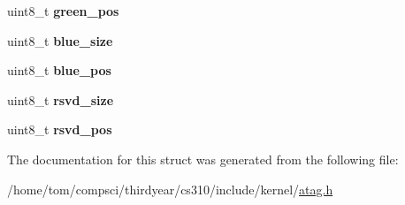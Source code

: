 \begin{DoxyCompactItemize}
\item 
\mbox{\label{structatag__videolfb_a6709301934177e265dcc87f13f64bd4a}} 
uint8\+\_\+t {\bfseries green\+\_\+pos}
\item 
\mbox{\label{structatag__videolfb_a240d9c637a8dac4b6bccba93d2561230}} 
uint8\+\_\+t {\bfseries blue\+\_\+size}
\item 
\mbox{\label{structatag__videolfb_ad1dabc14bd15a832bef855c4fc6e6089}} 
uint8\+\_\+t {\bfseries blue\+\_\+pos}
\item 
\mbox{\label{structatag__videolfb_a107ebdb85314153a554fca1d842688de}} 
uint8\+\_\+t {\bfseries rsvd\+\_\+size}
\item 
\mbox{\label{structatag__videolfb_ab1de4ada3fc00dd623b5b891f8d3cf9c}} 
uint8\+\_\+t {\bfseries rsvd\+\_\+pos}
\end{DoxyCompactItemize}


The documentation for this struct was generated from the following file\+:\begin{DoxyCompactItemize}
\item 
/home/tom/compsci/thirdyear/cs310/include/kernel/\mbox{\hyperlink{atag_8h}{atag.\+h}}\end{DoxyCompactItemize}
